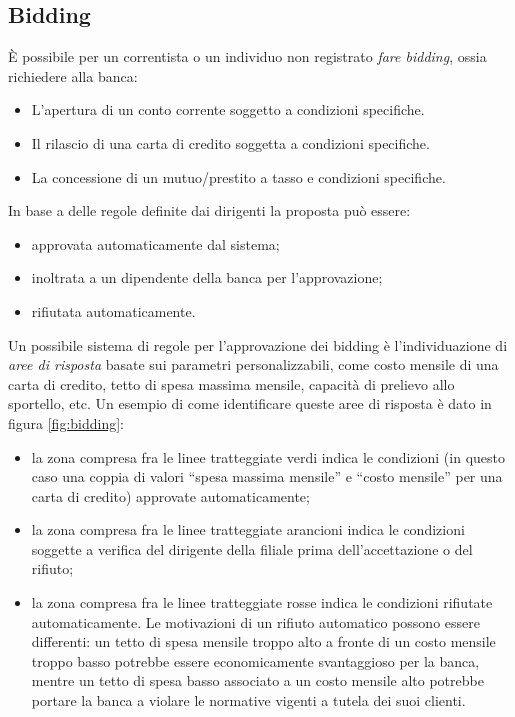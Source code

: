 \subsection{Bidding}

\`E possibile per un correntista o un individuo non registrato \emph{fare bidding}, ossia richiedere alla banca:
\begin{itemize}
	\item L'apertura di un conto corrente soggetto a condizioni specifiche.
	\item Il rilascio di una carta di credito soggetta a condizioni specifiche.
	\item La concessione di un mutuo/prestito a tasso e condizioni specifiche.
\end{itemize}

In base a delle regole definite dai dirigenti la proposta pu\`o essere:
\begin{itemize}
	\item approvata automaticamente dal sistema;
	\item inoltrata a un dipendente della banca per l'approvazione;
	\item rifiutata automaticamente.
\end{itemize}

Un possibile sistema di regole per l'approvazione dei bidding \`e l'individuazione di \emph{aree di risposta} basate sui parametri personalizzabili, come costo mensile di una carta di credito, tetto di spesa massima mensile, capacit\`a di prelievo allo sportello, etc.
Un esempio di come identificare queste aree di risposta \`e dato in figura \ref{fig:bidding}:
\begin{itemize}
	\item la zona compresa fra le linee tratteggiate verdi indica le condizioni (in questo caso una coppia di valori ``spesa massima mensile'' e ``costo mensile'' per una carta di credito) approvate automaticamente;
	\item la zona compresa fra le linee tratteggiate arancioni indica le condizioni soggette a verifica del dirigente della filiale prima dell'accettazione o del rifiuto;
	\item la zona compresa fra le linee tratteggiate rosse indica le condizioni rifiutate automaticamente.
		Le motivazioni di un rifiuto automatico possono essere differenti: un tetto di spesa mensile troppo alto a fronte di un costo mensile troppo basso potrebbe essere economicamente svantaggioso per la banca, mentre un tetto di spesa basso associato a un costo mensile alto potrebbe portare la banca a violare le normative vigenti a tutela dei suoi clienti.
\end{itemize}

